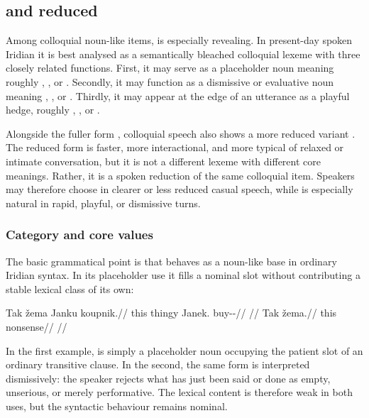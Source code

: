 \subsection{ and reduced }\label{sec:spoken-zema}

Among colloquial noun-like items,  is especially revealing. In
present-day spoken Iridian it is best analysed as a semantically bleached
colloquial lexeme with three closely related functions. First, it may serve as
a placeholder noun meaning roughly , , or
. Secondly, it may function as a dismissive or
evaluative noun meaning , , or . Thirdly, it may appear at the edge of an utterance as a playful hedge,
roughly , , or .

Alongside the fuller form , colloquial speech also shows a more
reduced variant . The reduced form is faster, more interactional, and
more typical of relaxed or intimate conversation, but it is not a different
lexeme with different core meanings. Rather, it is a spoken reduction of the
same colloquial item. Speakers may therefore choose  in clearer or
less reduced casual speech, while  is especially natural in rapid,
playful, or dismissive turns.

\subsubsection{Category and core values}

The basic grammatical point is that  behaves as a noun-like base in
ordinary Iridian syntax. In its placeholder use it fills a nominal slot without
contributing a stable lexical class of its own:

\pex
\a
\begingl
\gla Tak žema Janku koupnik.//
\glb this thingy Janek.\Trs{} buy-\Trs{}-\Pf{}//
\glft {}//
\endgl
\a
\begingl
\gla Tak žema.//
\glb this nonsense//
\glft {}//
\endgl
\xe

In the first example,  is simply a placeholder noun occupying the
patient slot of an ordinary transitive clause. In the second, the same form is
interpreted dismissively: the speaker rejects what has just been said or done as
empty, unserious, or merely performative. The lexical content is therefore weak
in both uses, but the syntactic behaviour remains nominal.

